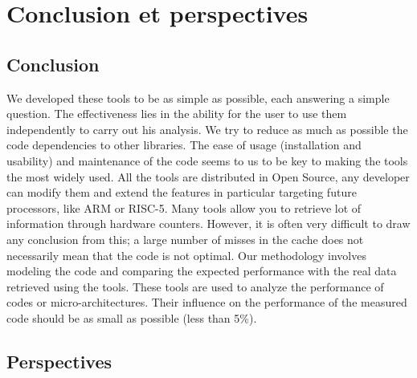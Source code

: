 \chapter{Conclusion et perspectives}
\label{chap:conclusion}
\minitoc


\section{Conclusion}

    We developed these tools to be as simple as possible, each answering a simple question. The effectiveness lies in the ability for the user to use them independently to carry out his analysis. We try to reduce as much as possible the code dependencies to other libraries. The ease of usage (installation and usability) and maintenance of the code seems to us to be key to making the tools the most widely used. All the tools are distributed in Open Source, any developer can modify them and extend the features in particular targeting future processors, like ARM or RISC-5. Many tools allow you to retrieve lot of information through hardware counters. However, it is often very difficult to draw any conclusion from this; a large number of misses in the cache does not necessarily mean that the code is not optimal. Our methodology involves modeling the code and comparing the expected performance with the real data retrieved using the tools. 
    These tools are used to analyze the performance of codes or micro-architectures. Their influence on the performance of the measured code should be as small as possible (less than 5\%).


\section{Perspectives}



